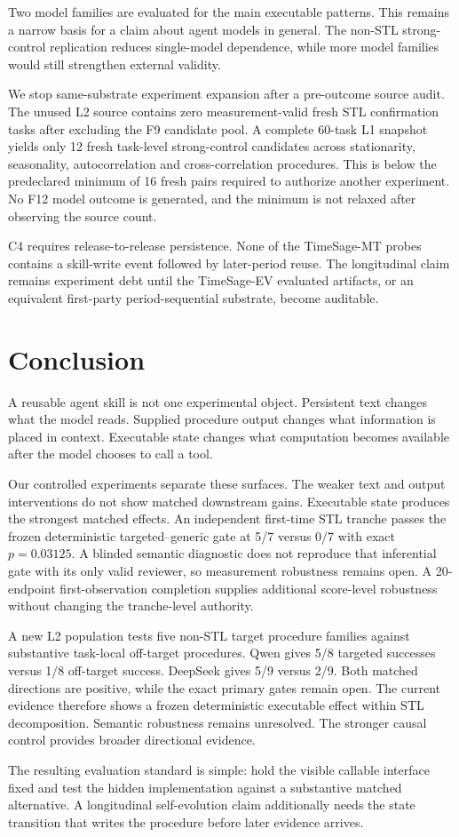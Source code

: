 Two model families are evaluated for the main executable patterns. This remains a narrow basis for a claim about agent models in general. The non-STL strong-control replication reduces single-model dependence, while more model families would still strengthen external validity.

We stop same-substrate experiment expansion after a pre-outcome source audit. The unused L2 source contains zero measurement-valid fresh STL confirmation tasks after excluding the F9 candidate pool. A complete 60-task L1 snapshot yields only 12 fresh task-level strong-control candidates across stationarity, seasonality, autocorrelation and cross-correlation procedures. This is below the predeclared minimum of 16 fresh pairs required to authorize another experiment. No F12 model outcome is generated, and the minimum is not relaxed after observing the source count.

C4 requires release-to-release persistence. None of the TimeSage-MT probes contains a skill-write event followed by later-period reuse. The longitudinal claim remains experiment debt until the TimeSage-EV evaluated artifacts, or an equivalent first-party period-sequential substrate, become auditable.

\section{Conclusion}
A reusable agent skill is not one experimental object. Persistent text changes what the model reads. Supplied procedure output changes what information is placed in context. Executable state changes what computation becomes available after the model chooses to call a tool.

Our controlled experiments separate these surfaces. The weaker text and output interventions do not show matched downstream gains. Executable state produces the strongest matched effects. An independent first-time STL tranche passes the frozen deterministic targeted--generic gate at 5/7 versus 0/7 with exact $p=0.03125$. A blinded semantic diagnostic does not reproduce that inferential gate with its only valid reviewer, so measurement robustness remains open. A 20-endpoint first-observation completion supplies additional score-level robustness without changing the tranche-level authority.

A new L2 population tests five non-STL target procedure families against substantive task-local off-target procedures. Qwen gives 5/8 targeted successes versus 1/8 off-target success. DeepSeek gives 5/9 versus 2/9. Both matched directions are positive, while the exact primary gates remain open. The current evidence therefore shows a frozen deterministic executable effect within STL decomposition. Semantic robustness remains unresolved. The stronger causal control provides broader directional evidence.

The resulting evaluation standard is simple: hold the visible callable interface fixed and test the hidden implementation against a substantive matched alternative. A longitudinal self-evolution claim additionally needs the state transition that writes the procedure before later evidence arrives.
